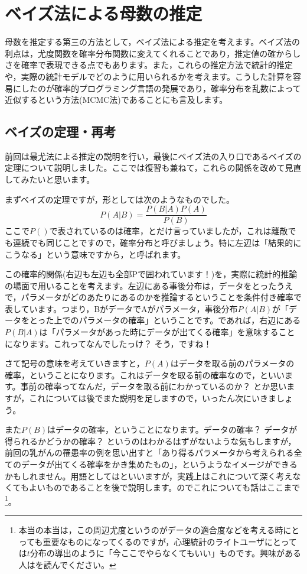 \documentclass{ltjsarticle}
\begin{document}
\chapter{ベイズ法による母数の推定}
\label{chapter25}
母数を推定する第三の方法として，ベイズ法による推定を考えます。ベイズ法の利点は，尤度関数を確率分布関数に変えてくれることであり，推定値の確からしさを確率で表現できる点でもあります。また，これらの推定方法で統計的推定や，実際の統計モデルでどのように用いられるかを考えます。こうした計算を容易にしたのが確率的プログラミング言語の発展であり，確率分布を乱数によって近似するという方法(MCMC法)であることにも言及します。
\section{ベイズの定理・再考}
前回は最尤法による推定の説明を行い，最後にベイズ法の入り口であるベイズの定理について説明しました。ここでは復習も兼ねて，これらの関係を改めて見直してみたいと思います。

まずベイズの定理ですが，形としては次のようなものでした。
\[ P(A|B) = \frac{P(B|A)P(A)}{P(B)}\]
ここで$P()$で表されているのは確率，とだけ言っていましたが，これは離散でも連続でも同じことですので，確率分布と呼びましょう。特に左辺は「結果的にこうなる」という意味ですから，と呼ばれます。

この確率的関係(右辺も左辺も全部Pで囲われています！)を，実際に統計的推論の場面で用いることを考えます。左辺にある事後分布は，データをとったうえで，パラメータがどのあたりにあるのかを推論するということを条件付き確率で表しています。つまり，BがデータでAがパラメータ，事後分布$P(A|B)$が「データをとった上でのパラメータの確率」ということです。であれば，右辺にある$P(B|A)$は「パラメータがあった時にデータが出てくる確率」を意味することになります。これってなんでしたっけ？ そう，ですね！

さて記号の意味を考えていきますと，$P(A)$はデータを取る前のパラメータの確率，ということになります。これはデータを取る前の確率なので，といいます。事前の確率ってなんだ，データを取る前にわかっているのか？ とか思いますが，これについては後でまた説明を足しますので，いったん次にいきましょう。

また$P(B)$はデータの確率，ということになります。データの確率？ データが得られるかどうかの確率？ というのはわかるはずがないような気もしますが，前回の乳がんの罹患率の例を思い出すと「あり得るパラメータから考えられる全てのデータが出てくる確率をかき集めたもの」，というようなイメージができるかもしれません。用語としてはといいますが，実践上はこれについて深く考えなくてもよいものであることを後で説明します。のでこれについても話はここまで\footnote{本当の本当は，この周辺尤度というのがデータの適合度などを考える時にとっても重要なものになってくるのですが，心理統計のライトユーザにとっては$t$分布の導出のように「今ここでやらなくてもいい」ものです。興味がある人は\citet{浜田201912}を読んでください。}。
\end{document}
